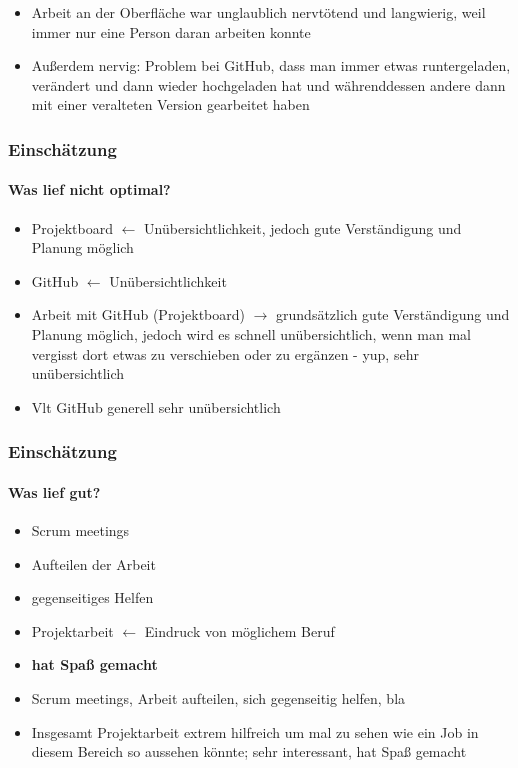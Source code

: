 \documentclass[notes]{beamer}
\begin{document}
	\note
	{
		\begin{itemize}
			\item Arbeit an der Oberfläche war unglaublich nervtötend und langwierig, weil immer nur eine Person daran arbeiten konnte
			\item Außerdem nervig: Problem bei GitHub, dass man immer etwas runtergeladen, verändert und dann wieder hochgeladen hat und währenddessen andere dann mit einer veralteten Version gearbeitet haben
		\end{itemize}
	}
	\begin{frame}
		\frametitle{Einschätzung}
		\framesubtitle{Was lief nicht optimal?}
		\begin{itemize}
			\item Projektboard $\leftarrow$ Unübersichtlichkeit, jedoch gute Verständigung und Planung möglich
			\item GitHub $\leftarrow$ Unübersichtlichkeit
		\end{itemize}
	\end{frame}
	\note
	{
		\begin{itemize}
			\item Arbeit mit GitHub (Projektboard) $\rightarrow$ grundsätzlich gute Verständigung und Planung möglich, jedoch wird es schnell unübersichtlich, wenn man mal vergisst dort etwas zu verschieben oder zu ergänzen - yup, sehr unübersichtlich
			\item Vlt GitHub generell sehr unübersichtlich
		\end{itemize}
	}
	\begin{frame}
		\frametitle{Einschätzung}
		\framesubtitle{Was lief gut?}
		\begin{itemize}
			\item Scrum meetings
			\item Aufteilen der Arbeit
			\item gegenseitiges Helfen
			\item Projektarbeit $\leftarrow$ Eindruck von möglichem Beruf
			\item \textbf{hat Spaß gemacht}
		\end{itemize}
	\end{frame}
	\note
	{
		\begin{itemize}
			\item Scrum meetings, Arbeit aufteilen, sich gegenseitig helfen, bla
			\item Insgesamt Projektarbeit extrem hilfreich um mal zu sehen wie ein Job in diesem Bereich so aussehen könnte; sehr interessant, hat Spaß gemacht
		\end{itemize}
	}
\end{document}
